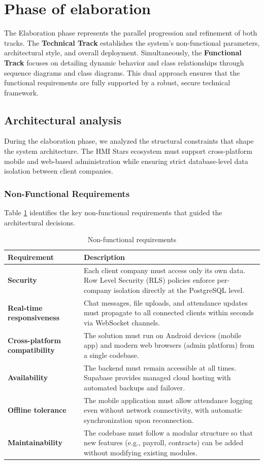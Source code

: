 \section{Phase of elaboration}

The Elaboration phase represents the parallel progression and refinement of both tracks. The \textbf{Technical Track} establishes the system's non-functional parameters, architectural style, and overall deployment. Simultaneously, the \textbf{Functional Track} focuses on detailing dynamic behavior and class relationships through sequence diagrams and class diagrams. This dual approach ensures that the functional requirements are fully supported by a robust, secure technical framework.

\subsection{Architectural analysis}
\label{subsec:arch_analysis}
During the elaboration phase, we analyzed the structural constraints that shape the system architecture. The HMI Stars ecosystem must support cross-platform mobile and web-based administration while ensuring strict database-level data isolation between client companies.

\subsubsection{Non-Functional Requirements}
Table \ref{tab:nfr} identifies the key non-functional requirements that guided the architectural decisions.

\begin{table}[H]
\centering
\caption{Non-functional requirements}
\label{tab:nfr}
\begin{tabular}{|l|p{9.5cm}|}
\hline
\textbf{Requirement} & \textbf{Description} \\
\hline
\textbf{Security} & Each client company must access only its own data. Row Level Security (RLS) policies enforce per-company isolation directly at the PostgreSQL level. \\
\hline
\textbf{Real-time responsiveness} & Chat messages, file uploads, and attendance updates must propagate to all connected clients within seconds via WebSocket channels. \\
\hline
\textbf{Cross-platform compatibility} & The solution must run on Android devices (mobile app) and modern web browsers (admin platform) from a single codebase. \\
\hline
\textbf{Availability} & The backend must remain accessible at all times. Supabase provides managed cloud hosting with automated backups and failover. \\
\hline
\textbf{Offline tolerance} & The mobile application must allow attendance logging even without network connectivity, with automatic synchronization upon reconnection. \\
\hline
\textbf{Maintainability} & The codebase must follow a modular structure so that new features (e.g., payroll, contracts) can be added without modifying existing modules. \\
\hline
\end{tabular}
\end{table}

